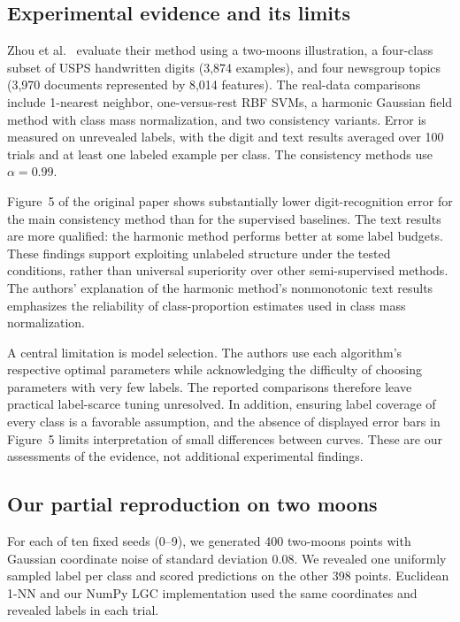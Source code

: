 \subsection{Experimental evidence and its limits}
Zhou et al.~\cite{zhou2003consistency} evaluate their method using a
two-moons illustration, a four-class subset of USPS handwritten digits
(3,874 examples), and four newsgroup topics (3,970 documents represented
by 8,014 features). The real-data comparisons include 1-nearest neighbor,
one-versus-rest RBF SVMs, a harmonic Gaussian field method with class mass
normalization, and two consistency variants. Error is measured on unrevealed
labels, with the digit and text results averaged over 100 trials and at least
one labeled example per class. The consistency methods use $\alpha=0.99$.

Figure~5 of the original paper shows substantially lower digit-recognition
error for the main consistency method than for the supervised baselines.
The text results are more qualified: the harmonic method performs better
at some label budgets. These findings support exploiting unlabeled structure
under the tested conditions, rather than universal superiority over other
semi-supervised methods. The authors' explanation of the harmonic method's
nonmonotonic text results emphasizes the reliability of class-proportion
estimates used in class mass normalization.

A central limitation is model selection. The authors use each algorithm's
respective optimal parameters while acknowledging the difficulty of choosing
parameters with very few labels. The reported comparisons therefore leave
practical label-scarce tuning unresolved. In addition, ensuring label coverage
of every class is a favorable assumption, and the absence of displayed error
bars in Figure~5 limits interpretation of small differences between curves.
These are our assessments of the evidence, not additional experimental findings.

\subsection{Our partial reproduction on two moons}
For each of ten fixed seeds (0--9), we generated 400 two-moons points
with Gaussian coordinate noise of standard deviation 0.08. We revealed one
uniformly sampled label per class and scored predictions on the other 398
points. Euclidean 1-NN and our NumPy LGC implementation used the same
coordinates and revealed labels in each trial.

